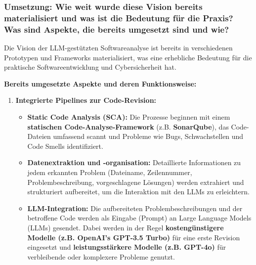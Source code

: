 \subsubsection*{Umsetzung: Wie weit wurde diese Vision bereits materialisiert und was ist die Bedeutung für die Praxis? Was sind Aspekte, die bereits umgesetzt sind und wie?}

Die Vision der LLM-gestützten Softwareanalyse ist bereits in verschiedenen Prototypen und Frameworks materialisiert, was eine erhebliche Bedeutung für die praktische Softwareentwicklung und Cybersicherheit hat.

\textbf{Bereits umgesetzte Aspekte und deren Funktionsweise:}

\begin{enumerate}
    \item \textbf{Integrierte Pipelines zur Code-Revision:}
    \begin{itemize}
        \item \textbf{Static Code Analysis (SCA):} Die Prozesse beginnen mit einem \textbf{statischen Code-Analyse-Framework} (z.B. \textbf{SonarQube}), das Code-Dateien umfassend scannt und Probleme wie Bugs, Schwachstellen und Code Smells identifiziert.
        \item \textbf{Datenextraktion und -organisation:} Detaillierte Informationen zu jedem erkannten Problem (Dateiname, Zeilennummer, Problembeschreibung, vorgeschlagene Lösungen) werden extrahiert und strukturiert aufbereitet, um die Interaktion mit den LLMs zu erleichtern.
        \item \textbf{LLM-Integration:} Die aufbereiteten Problembeschreibungen und der betroffene Code werden als Eingabe (Prompt) an Large Language Models (LLMs) gesendet. Dabei werden in der Regel \textbf{kostengünstigere Modelle (z.B. OpenAI’s GPT-3.5 Turbo)} für eine erste Revision eingesetzt und \textbf{leistungsstärkere Modelle (z.B. GPT-4o)} für verbleibende oder komplexere Probleme genutzt.
    \end{itemize}


\end{enumerate}
